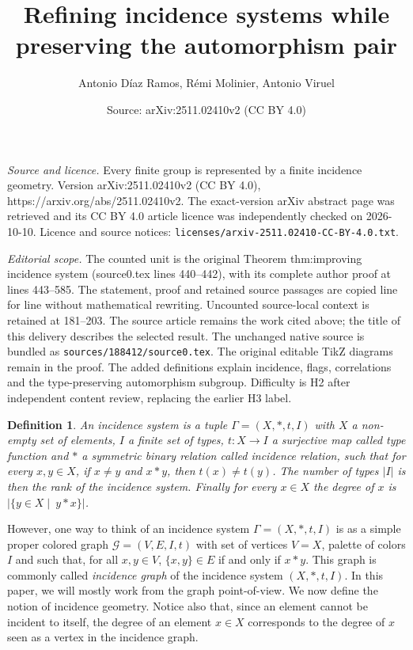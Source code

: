 \documentclass[10pt,a4paper]{amsart}
\title{Refining incidence systems while preserving the automorphism pair}
\author{Antonio D\'iaz Ramos, R\'emi Molinier, Antonio Viruel}
\date{Source: arXiv:2511.02410v2 (CC BY 4.0)}
\newtheorem{definition}{Definition}
\newcommand{\G}{\mathcal{G}}
\begin{document}
\maketitle

\noindent\emph{Source and licence.} Every finite group is represented by a finite incidence geometry. Version arXiv:2511.02410v2 (CC BY 4.0), https://arxiv.org/abs/2511.02410v2. The exact-version arXiv abstract page was retrieved and its CC BY 4.0 article licence was independently checked on 2026-10-10. Licence and source notices: \texttt{licenses/arxiv-2511.02410-CC-BY-4.0.txt}.\par\smallskip

\noindent\textit{Editorial scope.} The counted unit is the original Theorem thm:improving incidence system (source0.tex lines 440--442), with its complete author proof at lines 443--585. The statement, proof and retained source passages are copied line for line without mathematical rewriting. Uncounted source-local context is retained at 181--203. The source article remains the work cited above; the title of this delivery describes the selected result. The unchanged native source is bundled as \texttt{sources/188412/source0.tex}. The original editable TikZ diagrams remain in the proof. The added definitions explain incidence, flags, correlations and the type-preserving automorphism subgroup. Difficulty is H2 after independent content review, replacing the earlier H3 label.
\begin{definition}
An \emph{incidence system} is a tuple $\Gamma=(X,\ast,t,I)$ with $X$ a non-empty set of \emph{elements}, $I$ a finite set of \emph{types}, $t\colon X\to I$ a surjective map called \emph{type function} and $\ast$ a symmetric binary relation called \emph{incidence relation}, such that for every $x,y\in X$, if $x\neq y$ and $x\ast y$, then $t(x)\neq t(y)$. The number of types $|I|$ is then the \emph{rank} of the incidence system. Finally for every $x\in X$ the \emph{degree} of $x$ is $|\{y\in X\mid\ y\ast x\}|$. 
\end{definition}

However, one way to think of an incidence system $\Gamma=(X,\ast,t,I)$ is as a simple proper colored graph $\G=(V,E,I,t)$ with set of vertices $V=X$, palette of colors $I$ and such that, for all $x,y\in V$, $\{x,y\}\in E$ if and only if $x\ast y$. This graph is commonly called \emph{incidence graph} of the incidence system $(X,\ast,t,I)$. In this paper, we will mostly work from the graph point-of-view. 
We now define the notion of incidence geometry. Notice also that, since an element cannot be incident to itself, the degree of an element $x\in X$ corresponds to the degree of $x$ seen as a vertex in the incidence graph.
\end{document}
